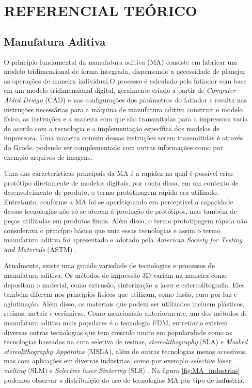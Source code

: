 \chapter{REFERENCIAL TEÓRICO}

\section{Manufatura Aditiva}
O princípio fundamental da manufatura aditiva (MA) consiste em fabricar um modelo tridimensional de forma integrada, dispensando a necessidade de planejar as operações de maneira individual.O processo é calculado pelo fatiador com base em um modelo tridimensional digital, geralmente criado a partir de \textit{Computer Aided Design} (CAD) e nas configurações dos parâmetros do fatiador e resulta nas instruções necessárias para a máquina de manufatura aditiva construir o modelo físico, as instruções e a maneira com que são transmitidas para a impressora varia de acordo com a tecnologia e a implementação específica dos modelos de impressora. Uma maneira comum dessas instruções serem transmitidas é através do Gcode, podendo ser complementado com outras informações como por exemplo arquivos de imagens.

Uma das características principais da MA é a rapidez na qual é possível criar protótipo diretamente de modelos digitais, por conta disso, em um contexto de desenvolvimento de produto, o termo prototipagem rápida era utilizado. Entretanto, conforme a MA foi se aperfeiçoando era perceptível a capacidade dessas tecnologias não só se aterem à produção de protótipos, mas também de peças utilizadas em produtos finais. Além disso, o termo prototipagem rápida não considerava o princípio básico que unia essas tecnologias e assim o termo manufatura aditiva foi apresentado e adotado pela \textit{American Society for Testing and Materials} (ASTM) \cite{gibson15}.

Atualmente, existe uma grande variedade de tecnologias e processos de manufatura aditiva. Os métodos de impressão 3D variam na maneira como depositam o material, como extrusão, sinterização a  laser e estereolitografia. Eles também diferem nos princípios físicos que utilizam, como fusão, cura por luz e aglutinação. Além disso, os materiais que podem ser utilizados incluem plásticos, resinas, metais e cerâmicas. Como mencionado anteriormente, um dos métodos de manufatura aditiva mais populares é a tecnologia FDM, entretanto existem diversas outras tecnologias que tem crescido muito em popularidade como as tecnologias baseadas na cura seletiva de resinas, \textit{stereolithography} (SLA) e \textit{Masked stereolithography Apparatus} (MSLA), além de outras tecnologias menos acessíveis, mas com aplicações em diversas industrias, como por exemplo \textit{selective laser melting} (SLM) e \textit{Selective laser Sintering} (SLS) \cite{bikas16}. Na figura \ref{fig:MA_industrias} podemos observar a distribuição do uso de tecnologias MA por tipo de industria.   

